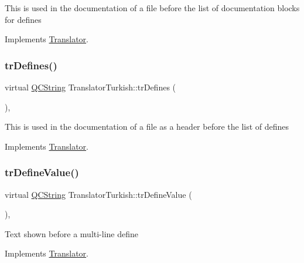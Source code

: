 This is used in the documentation of a file before the list of documentation blocks for defines 

Implements \mbox{\hyperlink{class_translator}{Translator}}.

\mbox{\label{class_translator_turkish_a82bfd9f6b163ac8a5c13f46bc4faac55}} 
\subsubsection{\texorpdfstring{trDefines()}{trDefines()}}
{\footnotesize\ttfamily virtual \mbox{\hyperlink{class_q_c_string}{Q\+C\+String}} Translator\+Turkish\+::tr\+Defines (\begin{DoxyParamCaption}{ }\end{DoxyParamCaption})\hspace{0.3cm}{\ttfamily [inline]}, {\ttfamily [virtual]}}

This is used in the documentation of a file as a header before the list of defines 

Implements \mbox{\hyperlink{class_translator}{Translator}}.

\mbox{\label{class_translator_turkish_a4b5569f52d4473e88ff3dc212c308f08}} 
\subsubsection{\texorpdfstring{trDefineValue()}{trDefineValue()}}
{\footnotesize\ttfamily virtual \mbox{\hyperlink{class_q_c_string}{Q\+C\+String}} Translator\+Turkish\+::tr\+Define\+Value (\begin{DoxyParamCaption}{ }\end{DoxyParamCaption})\hspace{0.3cm}{\ttfamily [inline]}, {\ttfamily [virtual]}}

Text shown before a multi-\/line define 

Implements \mbox{\hyperlink{class_translator}{Translator}}.

\mbox{\label{class_translator_turkish_af7c4cfebf40ea61536363657cde6a115}} 
